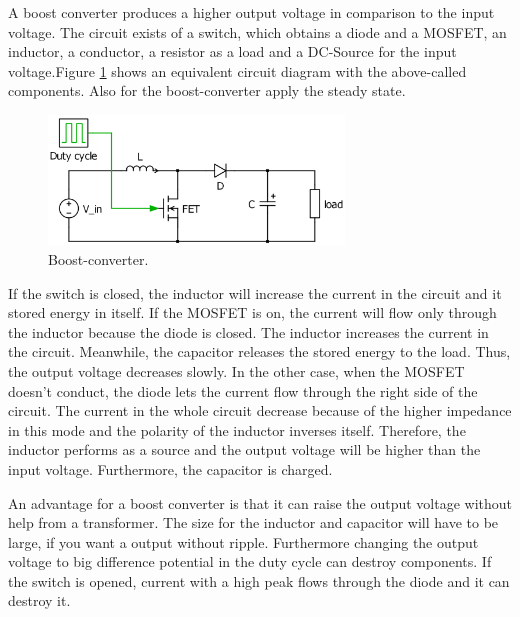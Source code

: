 A boost converter produces a higher output voltage in comparison to the input voltage. The circuit exists of a switch, which obtains a diode and a MOSFET, an inductor, a conductor, a resistor as a load and a DC-Source for the input voltage.Figure \ref{Boost-converter} shows an equivalent circuit diagram with the above-called components. Also for the boost-converter apply the steady state.

\begin{figure}[htbp]
	\begin{center}
		\includegraphics[width=0.7\textwidth]{../Pictures/Boost-converter}
		\caption{Boost-converter.}
		\label{Boost-converter}
	\end{center}	
\end{figure}

If the switch is closed, the inductor will increase the current in the circuit and it stored energy in itself. If the MOSFET is on, the current will flow only through the inductor because the diode is closed. The inductor increases the current in the circuit. Meanwhile, the capacitor releases the stored energy to the load. Thus, the output voltage decreases slowly. In the other case, when the MOSFET doesn’t conduct, the diode lets the current flow through the right side of the circuit. The current in the whole circuit decrease because of the higher impedance in this mode and the polarity of the inductor inverses itself. Therefore, the inductor performs as a source and the output voltage will be higher than the input voltage. Furthermore, the capacitor is charged.

An advantage for a boost converter is that it can raise the output voltage without help from a transformer. 
The size for the inductor and capacitor will have to be large, if you want a output without ripple. Furthermore changing the output voltage to big difference potential in the duty cycle can destroy components. If the switch is opened, current with a high peak flows through the diode and it can destroy it.
